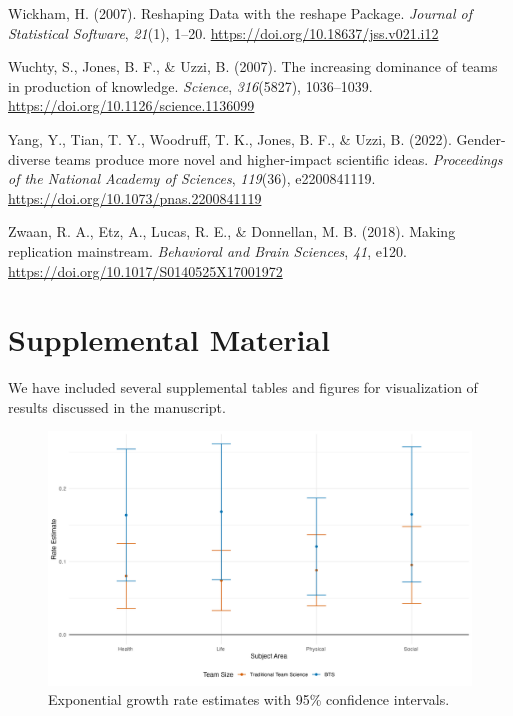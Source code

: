 \documentclass[
  man,floatsintext]{apa7}
\newlength{\cslhangindent}
\newenvironment{CSLReferences}[2] %
 {\begin{list}{}{%
  \setlength{\itemindent}{0pt}
  \setlength{\leftmargin}{0pt}
  \setlength{\parsep}{0pt}
  \ifodd #1
   \setlength{\leftmargin}{\cslhangindent}
   \setlength{\itemindent}{-1\cslhangindent}
  \fi
  \setlength{\itemsep}{#2\baselineskip}}}
 {\end{list}}
\begin{document}
\begin{CSLReferences}{1}{0}
Wickham, H. (2007). Reshaping Data with the reshape Package. \emph{Journal of Statistical Software}, \emph{21}(1), 1--20. \url{https://doi.org/10.18637/jss.v021.i12}

Wuchty, S., Jones, B. F., \& Uzzi, B. (2007). The increasing dominance of teams in production of knowledge. \emph{Science}, \emph{316}(5827), 1036--1039. \url{https://doi.org/10.1126/science.1136099}

Yang, Y., Tian, T. Y., Woodruff, T. K., Jones, B. F., \& Uzzi, B. (2022). Gender-diverse teams produce more novel and higher-impact scientific ideas. \emph{Proceedings of the National Academy of Sciences}, \emph{119}(36), e2200841119. \url{https://doi.org/10.1073/pnas.2200841119}

Zwaan, R. A., Etz, A., Lucas, R. E., \& Donnellan, M. B. (2018). Making replication mainstream. \emph{Behavioral and Brain Sciences}, \emph{41}, e120. \url{https://doi.org/10.1017/S0140525X17001972}

\end{CSLReferences}

\newpage

\appendix


\section{Supplemental Material}\label{supplemental-material}

We have included several supplemental tables and figures for visualization of results discussed in the manuscript.

\begin{figure}
\includegraphics[width=1\linewidth]{figure/figure_3_growth} \caption{Exponential growth rate estimates with 95\% confidence intervals.}\label{fig:rate-estimates-fig}
\end{figure}
\end{document}
